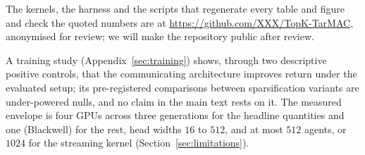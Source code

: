 The kernels, the harness and the scripts that regenerate every table and figure
and check the quoted numbers are at
\url{https://github.com/XXX/TopK-TarMAC}, anonymised for review; we will make
the repository public after review.

A training study
(Appendix~\ref{sec:training}) shows, through two descriptive positive controls,
that the communicating architecture improves return under the evaluated setup;
its pre-registered comparisons between sparsification variants are
under-powered nulls, and no claim in the main text rests on it. The measured
envelope is four GPUs across three generations for the headline quantities and
one (Blackwell) for the rest, head widths $16$ to $512$, and at most $512$
agents, or $1024$ for the streaming kernel (Section~\ref{sec:limitations}).
